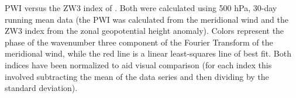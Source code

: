 \label{fig:metric_vs_zw3}
PWI versus the ZW3 index of \citet{Raphael2004}. Both were calculated using 500 hPa, 30-day running mean data (the PWI was calculated from the meridional wind and the ZW3 index from the zonal geopotential height anomaly). Colors represent the phase of the wavenumber three component of the Fourier Transform of the meridional wind, while the red line is a linear least-squares line of best fit. Both indices have been normalized to aid visual comparison (for each index this involved subtracting the mean of the data series and then dividing by the standard deviation).